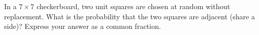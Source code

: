 In a $7\times7$ checkerboard, two unit squares are chosen at random without replacement. What is the probability that the two squares are adjacent (share a side)? Express your answer as a common fraction.
